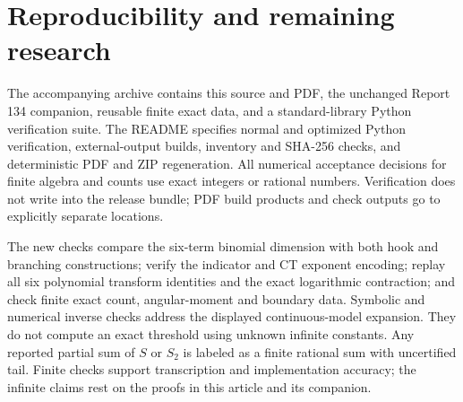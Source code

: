 \documentclass[11pt,letterpaper]{article}
\theoremstyle{remark}\newtheorem{remark}[theorem]{Remark}
\numberwithin{equation}{section}
\begin{document}
\section{Reproducibility and remaining research}\label{upo:rat:sec:reproduction}
The accompanying archive contains this source and PDF, the unchanged
Report 134 companion, reusable finite exact data, and a standard-library
Python verification suite. The README specifies normal and optimized
Python verification, external-output builds, inventory and SHA-256
checks, and deterministic PDF and ZIP regeneration. All numerical
acceptance decisions for finite algebra and counts use exact integers
or rational numbers. Verification does not write into the release
bundle; PDF build products and check outputs go to explicitly separate
locations.

The new checks compare the six-term binomial dimension with both hook
and branching constructions; verify the indicator and CT exponent
encoding; replay all six polynomial transform identities and the exact logarithmic
contraction; and check finite exact count, angular-moment and boundary data. Symbolic and numerical inverse checks
address the displayed continuous-model expansion. They do not compute
an exact threshold using unknown infinite constants. Any reported
partial sum of $S$ or $S_2$ is labeled as a finite rational sum with
uncertified tail. Finite checks support transcription and implementation accuracy;
the infinite claims rest on the proofs in this article and its companion.
\end{document}
